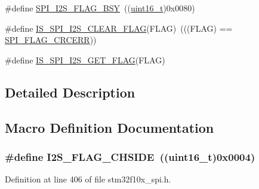 \begin{DoxyCompactItemize}
\item 
\#define \hyperlink{group___s_p_i___i2_s__flags__definition_ga4551095df1365cf2a760282a34279b3c}{S\+P\+I\+\_\+\+I2\+S\+\_\+\+F\+L\+A\+G\+\_\+\+B\+SY}~((\hyperlink{_p_e___types_8h_a1f1825b69244eb3ad2c7165ddc99c956}{uint16\+\_\+t})0x0080)
\item 
\#define \hyperlink{group___s_p_i___i2_s__flags__definition_gab16c7f47712871b8f1b97de43841856f}{I\+S\+\_\+\+S\+P\+I\+\_\+\+I2\+S\+\_\+\+C\+L\+E\+A\+R\+\_\+\+F\+L\+AG}(F\+L\+AG)~(((F\+L\+AG) == \hyperlink{openmotestm_2library_2inc_2stm32f10x__spi_8h_a30fb6af50e1f3c61cb9de76b0101c889}{S\+P\+I\+\_\+\+F\+L\+A\+G\+\_\+\+C\+R\+C\+E\+RR}))
\item 
\#define \hyperlink{group___s_p_i___i2_s__flags__definition_ga1241471a018bc63ed140089ce8334b4f}{I\+S\+\_\+\+S\+P\+I\+\_\+\+I2\+S\+\_\+\+G\+E\+T\+\_\+\+F\+L\+AG}(F\+L\+AG)
\end{DoxyCompactItemize}


\subsection{Detailed Description}


\subsection{Macro Definition Documentation}
\subsubsection[{\texorpdfstring{I2\+S\+\_\+\+F\+L\+A\+G\+\_\+\+C\+H\+S\+I\+DE}{I2S_FLAG_CHSIDE}}]{\setlength{\rightskip}{0pt plus 5cm}\#define I2\+S\+\_\+\+F\+L\+A\+G\+\_\+\+C\+H\+S\+I\+DE~(({\bf uint16\+\_\+t})0x0004)}\hypertarget{group___s_p_i___i2_s__flags__definition_gaf0d629fd522a15aff188236d3254b2ad}{}\label{group___s_p_i___i2_s__flags__definition_gaf0d629fd522a15aff188236d3254b2ad}


Definition at line 406 of file stm32f10x\+\_\+spi.\+h.

